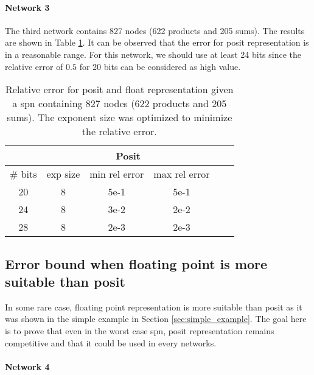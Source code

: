 \paragraph{Network 3}

The third network contains 827 nodes (622 products and 205 sums). The results are shown in Table \ref{tab:net3_res}. It can be observed that the error for posit representation is in a reasonable range. For this network, we should use at least 24 bits since the relative error of $0.5$ for 20 bits can be considered as high value.

\begin{table}[!ht]
	\centering
	\caption{Relative error for posit and float representation given a \gls{spn} containing 827 nodes (622 products and 205 sums). The exponent size was optimized to minimize the relative error.}
	\label{tab:net3_res}
	\begin{tabular}{|c||c|c|c||c|c|}
	\hline
		& \multicolumn{3}{c||}{Posit}\\
	\hline
		\# bits & exp size & min rel error & max rel error \\
	\hline
		20 & 8 & 5e-1 & 5e-1 \\
		24 & 8 & 3e-2 & 2e-2 \\
		28 & 8 & 2e-3 & 2e-3 \\
	\hline
	\end{tabular}
\end{table}


\subsection{Error bound when floating point is more suitable than posit}

In some rare case, floating point representation is more suitable than posit as it was shown in the simple example in Section \ref{sec:simple_example}. The goal here is to prove that even in the worst case \gls{spn}, posit representation remains competitive and that it could be used in every networks.

\paragraph{Network 4}

